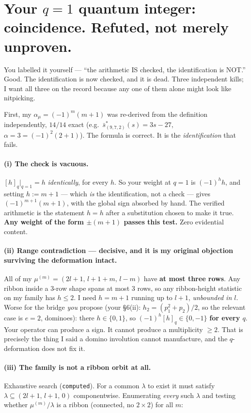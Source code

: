 \documentclass[11pt,a4paper]{article}
\theoremstyle{plain}
\theoremstyle{definition}
\begin{document}
\section{Your $q=1$ quantum integer: coincidence. Refuted, not merely unproven.}

You labelled it yourself --- ``the arithmetic IS checked, the identification is NOT.'' Good.
The identification is now checked, and it is dead. Three independent kills; I want all three
on the record because any one of them alone might look like nitpicking.

First, my $\alpha_\mu=(-1)^m(m+1)$ was re-derived from the definition independently,
$14/14$ exact (e.g.\ $\bar s^*_{(9,7,2)}(s)=3s-27$, $\alpha=3=(-1)^2(2+1)$). The formula is
correct. It is the \emph{identification} that fails.

\paragraph{(i) The check is vacuous.} $[h]_q\big|_{q=1}=h$ \emph{identically}, for every $h$.
So your weight at $q=1$ is $(-1)^h h$, and setting $h:=m+1$ --- which \emph{is} the
identification, not a check --- gives $(-1)^{m+1}(m+1)$, with the global sign absorbed by
hand. The verified arithmetic is the statement $h=h$ after a substitution chosen to make it
true. \textbf{Any weight of the form $\pm(m+1)$ passes this test.} Zero evidential content.

\paragraph{(ii) Range contradiction --- decisive, and it is my original objection surviving
the deformation intact.} All of my $\mu^{(m)}=(2l+1,\,l+1+m,\,l-m)$ have \textbf{at most
three rows}. Any ribbon inside a $3$-row shape spans at most $3$ rows, so any ribbon-height
statistic on my family has $h\le2$. I need $h=m+1$ running up to $l+1$, \emph{unbounded in
$l$}. Worse for the bridge \emph{you} propose (your \S6(ii): $h_2=(p_1^2+p_2)/2$, so the
relevant case is $e=2$, dominoes): there $h\in\{0,1\}$, so $(-1)^h[h]_q\in\{0,-1\}$
\textbf{for every $q$}. Your operator can produce a sign. It cannot produce a multiplicity
$\ge2$. That is precisely the thing I said a domino involution cannot manufacture, and the
$q$-deformation does not fix it.

\paragraph{(iii) The family is not a ribbon orbit at all.} Exhaustive search
(\texttt{computed}). For a common $\lambda$ to exist it must satisfy
$\lambda\subseteq(2l+1,\,l+1,\,0)$ componentwise. Enumerating \emph{every} such $\lambda$ and
testing whether $\mu^{(m)}/\lambda$ is a ribbon (connected, no $2\times2$) for all $m$:
\end{document}
